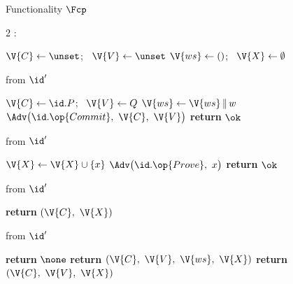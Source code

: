 \begin{interface}[nofloat]{Functionality $\Fcp$ \\
}

{\scriptsize
\setlength{\columnsep}{1.4em}
\begin{multicols}{2}
:
\begin{algorithmic}[1]
\setcounter{contline}{0}\algcont
\State $\V{C} \gets \unset$; \ $\V{V} \gets \unset$
\State $\V{ws} \gets ()$; \ $\V{X} \gets \emptyset$
\algsave
\end{algorithmic}
\vspace{1.4ex}

 \quad from $\id'$
\begin{algorithmic}[1]
\algcont
{} \label{ln:cpsame}
  \State $\V{C} \gets \id.P$; \ $\V{V} \gets Q$
\EndIf
\State $\V{ws} \gets \V{ws} \,\|\, w$ \label{ln:cpappend}
\State $\Adv\bigl(\id.\op{Commit},\ \V{C},\ \V{V}\bigr)$ \label{ln:cpreceipt}
\State \textbf{return} $\ok$
\algsave
\end{algorithmic}
\vspace{1.4ex}

 \quad from $\id'$
\begin{algorithmic}[1]
\algcont
{} \label{ln:cponlytrue}
\State $\V{X} \gets \V{X} \cup \{x\}$ \label{ln:cprecord}
\State $\Adv\bigl(\id.\op{Prove},\ x\bigr)$
\State \textbf{return} $\ok$
\algsave
\end{algorithmic}
\vspace{1.4ex}

\columnbreak

 \quad from $\id'$
\begin{algorithmic}[1]
\algcont
{}
\State \textbf{return} $(\V{C},\ \V{X})$ \label{ln:cpread}
\algsave
\end{algorithmic}
\vspace{1.4ex}

 \quad from $\id'$
\begin{algorithmic}[1]
\algcont
{}
  \State \textbf{return} $\none$
\EndIf
{}
  \State \textbf{return} $(\V{C},\ \V{V},\ \V{ws},\ \V{X})$ \label{ln:cpleakall}
\EndIf
\State \textbf{return} $(\V{C},\ \V{V},\ \V{X})$ \label{ln:cpleakhide}
\algsave
\end{algorithmic}
\end{multicols}}
\end{interface}
